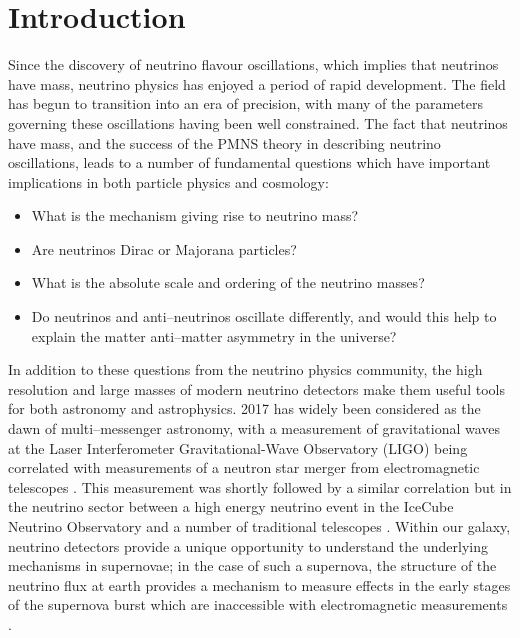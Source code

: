 \chapter{\label{ch:intro}Introduction} 


Since the discovery of neutrino flavour oscillations, which implies that
neutrinos have mass, neutrino physics has enjoyed a period of rapid development.
The field has begun to transition into an era of precision, with many of the
parameters governing these oscillations having been well constrained. The fact
that neutrinos have mass, and the success of the PMNS theory in describing
neutrino oscillations, leads to a number of fundamental questions which have
important implications in both particle physics and cosmology: 

\begin{itemize}
	\item What is the mechanism giving rise to neutrino mass? 
	\item Are neutrinos Dirac or Majorana particles?
	\item What is the absolute scale and ordering of the neutrino masses?
	\item Do neutrinos and anti--neutrinos oscillate differently, and would this 
	      help to explain the matter anti--matter asymmetry in the universe?
\end{itemize}

In addition to these questions from the neutrino physics community, the high
resolution and large masses of modern neutrino detectors make them useful tools
for both astronomy and astrophysics. 2017 has widely been considered as the dawn
of multi--messenger astronomy, with a measurement of gravitational waves at the 
Laser Interferometer Gravitational-Wave Observatory (LIGO) being correlated 
with measurements of a neutron star merger from electromagnetic telescopes 
\cite{Abbott2017}. This measurement was shortly followed by a similar 
correlation but in the neutrino sector between a high energy neutrino event in 
the IceCube Neutrino Observatory and a number of traditional telescopes 
\cite{Aartsen2018}. Within our galaxy, neutrino detectors provide a unique 
opportunity to understand the underlying mechanisms in supernovae; in the case 
of such a supernova, the structure of the neutrino flux at earth provides a 
mechanism to measure effects in the early stages of the supernova burst which 
are inaccessible with electromagnetic measurements \cite{Scholberg:2012id}.

